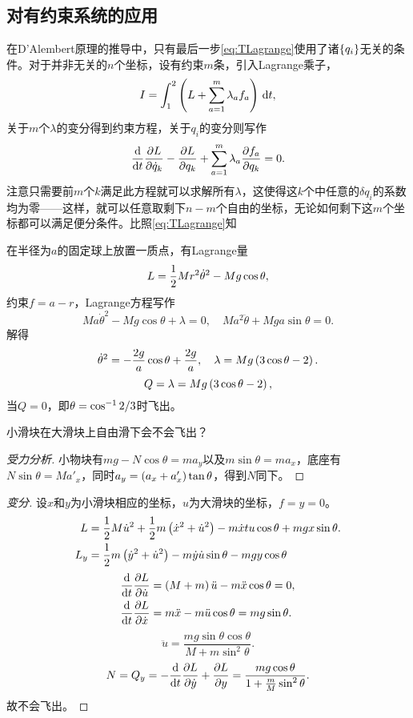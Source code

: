 \documentclass{ctexrep}
\begin{document}
\subsection{对有约束系统的应用}
在D'Alembert原理的推导中，只有最后一步\eqref{eq:TLagrange}使用了诸$\left\{q_i\right\}$无关的条件。对于并非无关的$n$个坐标，设有约束$m$条，引入Lagrange乘子，
\[ I=\int_1^2 \left(L+\sum_{a=1}^m \lambda_a f_a\right) \, \mathrm{d} t, \]
关于$m$个$\lambda$的变分得到约束方程，关于$q_i$的变分则写作
\[ \frac{\mathrm{d}}{\mathrm{d} t}\frac{\partial L}{\partial \dot{q}_k}-\frac{\partial L}{\partial q_k}+\sum_{a=1}^m \lambda_a\frac{\partial f_a}{\partial q_k}=0. \]
注意只需要前$m$个$k$满足此方程就可以求解所有$\lambda$，这使得这$k$个中任意的$\delta q_i$的系数均为零——这样，就可以任意取剩下$n-m$个自由的坐标，无论如何剩下这$m$个坐标都可以满足便分条件。比照\eqref{eq:TLagrange}知
\conclu{
\[ Q_k = -\sum_{a=1}^m \lambda_a \ddelon{f_a}{q_k}. \]
}
\begin{ex}
  在半径为$a$的固定球上放置一质点，有Lagrange量
  \[ L=\frac{1}{2} M r^2\dot{\theta}^2-Mg\cos\theta, \]
  约束$f=a-r$，Lagrange方程写作
  \[ Ma\dot{\theta}^2-Mg\cos\theta + \lambda = 0, \quad Ma^2\ddot{\theta}+Mga\sin\theta=0. \]
  解得
  \[ \dot{\theta}^2=-\frac{2g}{a}\cos\theta+\frac{2g}{a},\quad \lambda=Mg\left(3\cos\theta-2\right). \]
  \[ Q = \lambda = Mg\left(3\cos\theta-2\right), \]
  当$Q=0$，即$\theta=\cos^{-1}{2/3}$时飞出。
\end{ex}
\begin{ex}
  小滑块在大滑块上自由滑下会不会飞出？
\end{ex}
  \begin{proof}[受力分析]
    小物块有$mg-N\cos\theta = ma_y$以及$m\sin\theta=ma_x$，底座有$N\sin\theta = Ma'_x$，同时$a_y = \left(a_x+a'_x\right)\tan\theta$，得到$N$同下。
  \end{proof}
  \begin{proof}[变分]
    设$x$和$y$为小滑块相应的坐标，$u$为大滑块的坐标，$f=y=0$。
    \begin{align*}
      L &= \half M \dot{u}^2 + \half m \pare{\dot{x}^2+\dot{u}^2} - m\dot{x}\do t{u}\cos\theta + mgx\sin\theta.\\
      L_y &= \half m \pare{\dot{y}^2+\dot{u}^2} - m\dot{y}\dot{u}\sin\theta - mgy\cos\theta
    \end{align*}
    \begin{align*}
      \frac{\mathrm{d}}{\mathrm{d} t}\frac{\partial L}{\partial \dot{u}} &= \left(M+m\right)\ddot{u}-m\ddot{x}\cos\theta = 0,\\
      \frac{\mathrm{d}}{\mathrm{d} t}\frac{\partial L}{\partial \dot{x}} &= m\ddot{x}-m\ddot{u}\cos\theta = mg\sin\theta.
    \end{align*}
    \[ \ddot{u} = \frac{mg\sin\theta\cos\theta}{M+m\sin^2\theta}. \]
    \[ N = Q_y = -\frac{\mathrm{d}}{\mathrm{d} t}\frac{\partial L}{\partial \dot{y}}+\frac{\partial L}{\partial y} = \frac{mg\cos\theta}{1+\frac{m}{M}\sin^2\theta}. \]
    故不会飞出。
  \end{proof}
\end{document}
